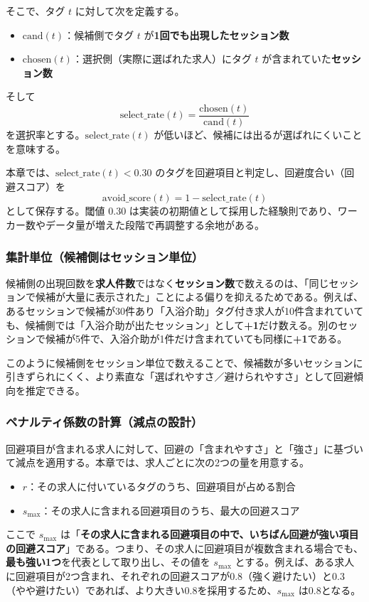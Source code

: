 そこで、タグ $t$ に対して次を定義する。
\begin{itemize}
\item $\mathrm{cand}(t)$：候補側でタグ $t$ が\textbf{1回でも出現したセッション数}
\item $\mathrm{chosen}(t)$：選択側（実際に選ばれた求人）にタグ $t$ が含まれていた\textbf{セッション数}
\end{itemize}
そして
\[
\mathrm{select\_rate}(t)=\frac{\mathrm{chosen}(t)}{\mathrm{cand}(t)}
\]
を選択率とする。$\mathrm{select\_rate}(t)$ が低いほど、候補には出るが選ばれにくいことを意味する。

本章では、$\mathrm{select\_rate}(t) < 0.30$ のタグを回避項目と判定し、回避度合い（回避スコア）を
\[
\mathrm{avoid\_score}(t)=1-\mathrm{select\_rate}(t)
\]
として保存する。閾値 $0.30$ は実装の初期値として採用した経験則であり、ワーカー数やデータ量が増えた段階で再調整する余地がある。

\subsubsection*{集計単位（候補側はセッション単位）}
候補側の出現回数を\textbf{求人件数}ではなく\textbf{セッション数}で数えるのは、「同じセッションで候補が大量に表示された」ことによる偏りを抑えるためである。例えば、あるセッションで候補が30件あり「入浴介助」タグ付き求人が10件含まれていても、候補側では「入浴介助が出たセッション」として\textbf{+1}だけ数える。別のセッションで候補が5件で、入浴介助が1件だけ含まれていても同様に\textbf{+1}である。

このように候補側をセッション単位で数えることで、候補数が多いセッションに引きずられにくく、より素直な「選ばれやすさ／避けられやすさ」として回避傾向を推定できる。

\subsubsection*{ペナルティ係数の計算（減点の設計）}
回避項目が含まれる求人に対して、回避の「含まれやすさ」と「強さ」に基づいて減点を適用する。本章では、求人ごとに次の2つの量を用意する。
\begin{itemize}
\item $r$：その求人に付いているタグのうち、回避項目が占める割合
\item $s_{\max}$：その求人に含まれる回避項目のうち、最大の回避スコア
\end{itemize}
ここで $s_{\max}$ は「\textbf{その求人に含まれる回避項目の中で、いちばん回避が強い項目の回避スコア}」である。つまり、その求人に回避項目が複数含まれる場合でも、\textbf{最も強い1つ}を代表として取り出し、その値を $s_{\max}$ とする。例えば、ある求人に回避項目が2つ含まれ、それぞれの回避スコアが0.8（強く避けたい）と0.3（やや避けたい）であれば、より大きい0.8を採用するため、$s_{\max}$ は0.8となる。

